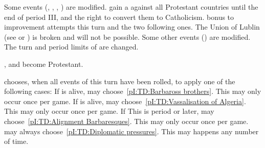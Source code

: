 \begin{digressions}

  \aparag[\CATHCR]
  \bparag Some events (, , , ) are
  modified.
  \bparag \POL gain a \CB against all Protestant countries until the end of
  period III, and the right to convert them to Catholicism.
  \aparag[\CATHCO]
  \bparag {} bonus to \STAB improvement attempts this turn and the two
  following ones.
  \aparag[Protestantism]
  \bparag The Union of Lublin (see  or
  ) is broken and will not be possible. Some other
  events () are modified.
  \bparag The turn and period limits of \POL are changed.
\end{digressions}





\phevnt
\aparag[Calvin] \paysPalatinat, \paysThuringe and \paysecosse become
Protestant.








\phevnt
\aparag \TUR chooses, when all events of this turn have been rolled, to apply
one of the following cases:
\bparag If  is alive, \TUR may choose~\ref{pI:TD:Barbaross
  brothers}. This may only occur once per game.
\bparag If  is alive, \TUR may
choose~\ref{pI:TD:Vassalisation of Algeria}. This may only occur once per
game.
\bparag If This is period  or later, \TUR may
choose~\ref{pI:TD:Alignment Barbaresques}. This may only occur once per game.
\bparag \TUR may always choose~\ref{pI:TD:Diplomatic pressures}. This may
happens any number of time.

